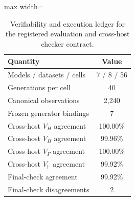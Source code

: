 \begin{table}[tbp]
\centering
\footnotesize
\caption{Verifiability and execution ledger for the registered evaluation and cross-host checker contract.}
\label{tab:verifiability_execution_ledger}
\begin{adjustbox}{max width=\linewidth}
\begin{tabular}{lc}
\toprule
Quantity & Value \\
\midrule
Models / datasets / cells & 7 / 8 / 56 \\
Generations per cell & 40 \\
Canonical observations & 2,240 \\
Frozen generator bindings & 7 \\
Cross-host $V_H$ agreement & 100.00\% \\
Cross-host $V_\Pi$ agreement & 99.96\% \\
Cross-host $V_\Gamma$ agreement & 100.00\% \\
Cross-host $V_\vdash$ agreement & 99.92\% \\
Final-check agreement & 99.92\% \\
Final-check disagreements & 2 \\
\bottomrule
\end{tabular}
\end{adjustbox}
\end{table}
